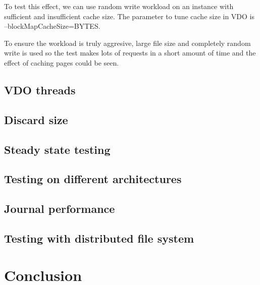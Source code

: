 \documentclass[
  color, %
  table, %
  lof,   %
  lot,   %
]{fithesis3}
\begin{document}

To test this effect, we can use random write workload on an instance with sufficient and insufficient cache size. The parameter to tune cache size in VDO is --blockMapCacheSize=BYTES.


To ensure the workload is truly aggresive, large file size and completely random write is used so the test makes lots of requests in a short amount of time and the effect of caching pages could be seen.



\section{VDO threads}
\section{Discard size}
\section{Steady state testing}
\section{Testing on different architectures}
\section{Journal performance}
\section{Testing with distributed file system}

\chapter{Conclusion}
\label{conclusion}
\end{document}
